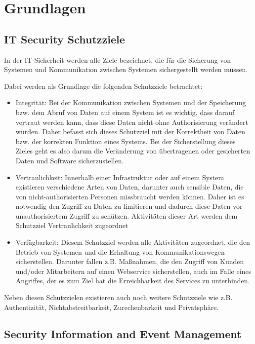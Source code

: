 \chapter{Grundlagen}
\label{cha:grundlagen}


\section{IT Security Schutzziele}
\label{cha:IT Security Schutzziele}

In der IT-Sicherheit werden alle Ziele bezeichnet, die für die Sicherung von Systemen und Kommunikation zwischen Systemen sichergestellt werden müssen. 

Dabei werden als Grundlage die folgenden Schutzziele betrachtet:
\begin{itemize}
\item Integrität: Bei der Kommunikation zwischen Systemen und der Speicherung bzw. dem Abruf von Daten auf einem System ist es wichtig, dass darauf vertraut werden kann, dass diese Daten nicht ohne Authorisierung verändert wurden. Daher befasst sich dieses Schutzziel mit der Korrektheit von Daten bzw. der korrekten Funktion eines Systems. Bei der Sicherstellung dieses Zieles geht es also darum die Veränderung von übertragenen oder gesicherten Daten und Software sicherzustellen.
\item Vertraulichkeit: Innerhalb einer Infrastruktur oder auf einem System existieren verschiedene Arten von Daten, darunter auch sensible Daten,  die von nicht-authorisierten Personen missbraucht werden können. Daher ist es notwendig den Zugriff zu Daten zu limitieren und dadurch diese Daten vor unauthorisiertem Zugriff zu schützen. Aktivitäten dieser Art werden dem Schutzziel Vertraulichkeit zugeordnet
\item Verfügbarkeit: Diesem Schutzziel werden alle Aktivitäten zugeordnet, die den Betrieb von Systemen und die Erhaltung von Kommunikationswegen sicherstellen. Darunter fallen z.B. Maßnahmen, die den Zugriff von Kunden und/oder Mitarbeitern auf einen Webservice sicherstellen, auch im Falle eines Angriffes, der es zum Ziel hat die Erreichbarkeit des Services zu unterbinden.
\end{itemize}
Neben diesen Schutzzielen existieren auch noch weitere Schutzziele wie z.B. Authentizität, Nichtabstreitbarkeit, Zurechenbarkeit und Privatsphäre.


\section{Security Information and Event Management}
\label{cha:Security Information and Event Management}

